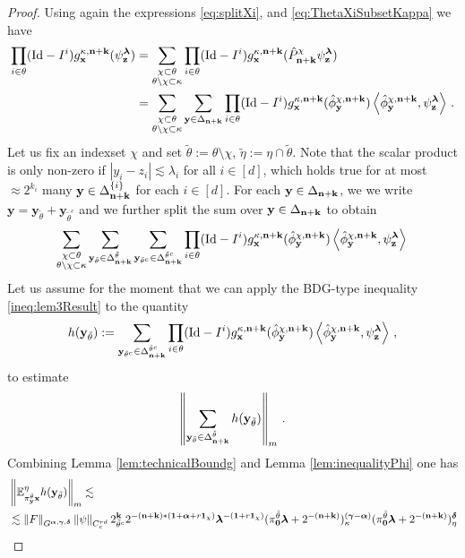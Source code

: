 \documentclass[12pt]{article}
\numberwithin{equation}{section}
\theoremstyle{plain}
\theoremstyle{definition}
\newcommand{\abs}[1]{\left\vert #1 \right\vert}
\newcommand{\scalar}[1]{\left\langle #1 \right\rangle}
\newcommand{\norm}[1]{\left\Vert #1\right\Vert}
\newcommand{\Id}{\mbox{Id}}
\def\bE{\mathbb{E}}\def\bW{\mathbb{W}}
\def\fk{\mathbf k}\def\fl{\mathbf l}
\def\fy{\mathbf y}\def\fz{\mathbf z}
\def\falpha{{\boldsymbol\alpha}}
\def\fgamma{{\boldsymbol\gamma}}
\def\fdelta{{\boldsymbol\delta}}
\def\flambda{{\boldsymbol\lambda}}
\def\foo{{\boldsymbol 0}}
\def\fone{{\boldsymbol 1}}
\begin{document}
\begin{proof}
  Using again the expressions \eqref{eq:splitXi}, and \eqref{eq:ThetaXiSubsetKappa} we have
    \begin{align*}
        \prod_{i\in\theta} (\Id-I^i)g_\fx^{\kappa,\fn+\fk}(\psi_\fz^\flambda) &= \sum_{\substack{\chi\subset\theta \\ \theta\setminus\chi\subset\kappa}} \prod_{i\in\theta}(\Id-I^i)g_{\fx}^{\kappa,\fn+\fk}(\hat P_{\fn+\fk}^\chi\psi_\fz^\flambda) \\
        &= \sum_{\substack{\chi\subset\theta \\ \theta\setminus\chi\subset\kappa}}\sum_{\fy\in\Delta_{\fn+\fk}} \prod_{i\in\theta}(\Id-I^i)g_{\fx}^{\kappa,\fn+\fk}(\hat\phi_\fy^{\chi,\fn+\fk})\scalar{\hat\phi^{\chi,\fn+\fk}_\fy,\psi_\fz^\flambda}\,.
    \end{align*}
    Let us fix an indexset $\chi$ and set $\tilde\theta := \theta\setminus\chi$, $\tilde\eta := \eta\cap\tilde\theta$. Note that the scalar product is only non-zero if $\abs{y_i-z_i}\lesssim \lambda_i$ for all $i\in[d]$, which holds true for at most $\approx 2^{k_i}$ many $\fy\in\Delta_{\fn+\fk}^{\{i\}}$ for each $i\in[d]$. For each $\fy\in\Delta_{\fn+\fk}$, we we write  $\fy= \fy_{\tilde\theta} +\fy_{\tilde\theta^c}$ and we further split the sum over $\fy\in\Delta_{\fn+\fk}$ to obtain 
    \[\sum_{\substack{\chi\subset\theta \\ \theta\setminus\chi\subset\kappa}}\sum_{\fy_{\tilde\theta}\in\Delta_{\fn+\fk}^{\tilde\theta}}\sum_{\fy_{\tilde\theta^c}\in\Delta_{\fn+\fk}^{\tilde\theta^c}} \prod_{i\in\theta}(\Id-I^i)g_{\fx}^{\kappa,\fn+\fk}(\hat\phi_\fy^{\chi,\fn+\fk})\scalar{\hat\phi^{\chi,\fn+\fk}_\fy,\psi_\fz^\flambda}  \,\] 
    Let us assume for the moment that we can apply the  BDG-type inequality \eqref{ineq:lem3Result} to  the quantity
    \[h(\fy_{\tilde\theta}) := \sum_{\fy_{\tilde\theta^c}\in\Delta^{\tilde\theta^c}_{\fn+\fk}} \prod_{i\in\theta}(\Id-I^i)g_\fx^{\kappa,\fn+\fk}(\hat\phi^{\chi,\fn+\fk}_\fy)\scalar{\hat\phi^{\chi,\fn+\fk}_\fy,\psi_\fz^{\flambda}}\,,
    \]
    to estimate
    \[
        \norm{\sum_{\fy_{\tilde\theta} \in\Delta_{\fn+\fk}^{\tilde\theta}} h(\fy_{\tilde\theta})}_m\,.
    \]
    Combining Lemma \ref{lem:technicalBoundg} and Lemma \ref{lem:inequalityPhi} one has
    \begin{align*}
        &\norm{\bE_{\pi^{\tilde\theta}_\fy \fx}^\eta  h(\fy_{\tilde\theta}) }_m\lesssim\\&\lesssim \norm{F}_{G^{\falpha,\fgamma,\fdelta}}\norm{\psi}_{C_c^{rd}}2^{\fk}_{{\tilde\theta^c}}2^{-(\fn+\fk)*(\fone+\falpha+r\fone_\chi)}\flambda^{-(\fone+r\fone_\chi)}(\pi_\foo^{\tilde\theta}\flambda+2^{-(\fn+\fk)})^{(\fgamma-\falpha)}_{\kappa} (\pi_\foo^{\tilde\theta}\flambda+2^{-(\fn+\fk)})^{\fdelta}_{\eta}\\

\end{align*}
\end{proof}
\end{document}

